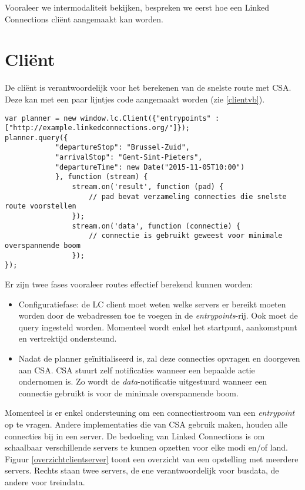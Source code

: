 Vooraleer we intermodaliteit bekijken, bespreken we eerst hoe een Linked Connections cli\"ent aangemaakt kan worden.

\section{Cli\"ent}

De cli\"ent is verantwoordelijk voor het berekenen van de snelste route met CSA. Deze kan met een paar lijntjes code aangemaakt worden (zie \ref{clientvb}).
\begin{lstlisting}[label=clientvb,caption=Code om een LC cli\"ent op te zetten in JavaScript.]
var planner = new window.lc.Client({"entrypoints" : ["http://example.linkedconnections.org/"]});
planner.query({
			"departureStop": "Brussel-Zuid",
			"arrivalStop": "Gent-Sint-Pieters",
			"departureTime": new Date("2015-11-05T10:00")
			}, function (stream) {
				stream.on('result', function (pad) {
					// pad bevat verzameling connecties die snelste route voorstellen
				});
			 	stream.on('data', function (connectie) {
			 		// connectie is gebruikt geweest voor minimale overspannende boom
			 	});
});
\end{lstlisting}
\label{vbclient}

Er zijn twee fases vooraleer routes effectief berekend kunnen worden:

\begin{itemize}
\item Configuratiefase: de LC client moet weten welke servers er bereikt moeten worden door de webadressen toe te voegen in de \textit{entrypoints}-rij. Ook moet de query ingesteld worden. Momenteel wordt enkel het startpunt, aankomstpunt en vertrektijd ondersteund.
\item Nadat de planner ge\"initialiseerd is, zal deze connecties opvragen en doorgeven aan CSA. CSA stuurt zelf notificaties wanneer een bepaalde actie ondernomen is. Zo wordt de \textit{data}-notificatie uitgestuurd wanneer een connectie gebruikt is voor de minimale overspannende boom.
\end{itemize}

Momenteel is er enkel ondersteuning om een connectiestroom van een \textit{entrypoint} op te vragen. Andere implementaties die van CSA gebruik maken, houden alle connecties bij in een server. De bedoeling van Linked Connections is om schaalbaar verschillende servers te kunnen opzetten voor elke modi en/of land. Figuur \ref{overzichtclientserver} toont een overzicht van een opstelling met meerdere servers. Rechts staan twee servers, de ene verantwoordelijk voor busdata, de andere voor treindata.

